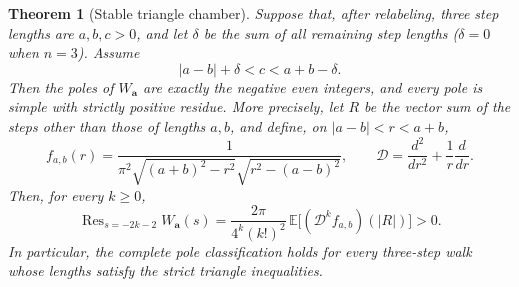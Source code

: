 \documentclass[11pt]{amsart}
\newtheorem{thm}{Theorem}[section]
\theoremstyle{definition}
\newcommand{\Res}{\operatorname{Res}}
\begin{document}
\begin{thm}[Stable triangle chamber]\label{thm:triangle-chamber}
Suppose that, after relabeling, three step lengths are $a,b,c>0$, and
let $\delta$ be the sum of all remaining step lengths ($\delta=0$
when $n=3$). Assume
\begin{equation}\label{eq:triangle-chamber}
 |a-b|+\delta<c<a+b-\delta.
\end{equation}
Then the poles of $W_{\boldsymbol a}$ are exactly the negative even
integers, and every pole is simple with strictly positive residue.
More precisely, let $R$ be the vector sum of the steps other than those
of lengths $a,b$, and define, on $|a-b|<r<a+b$,
\[
 f_{a,b}(r)=\frac1{\pi^2
 \sqrt{(a+b)^2-r^2}\sqrt{r^2-(a-b)^2}},\qquad
 \mathcal D=\frac{d^2}{dr^2}+\frac1r\frac d{dr}.
\]
Then, for every $k\ge0$,
\begin{equation}\label{eq:triangle-residue}
 \Res_{s=-2k-2}W_{\boldsymbol a}(s)
 =\frac{2\pi}{4^k(k!)^2}\,
       \mathbb E\bigl[(\mathcal D^k f_{a,b})(|R|)\bigr]>0.
\end{equation}
In particular, the complete pole classification holds for every
three-step walk whose lengths satisfy the strict triangle inequalities.
\end{thm}
\end{document}
